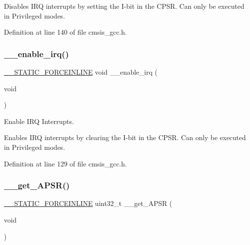 Disables I\+RQ interrupts by setting the I-\/bit in the C\+P\+SR. Can only be executed in Privileged modes. 

Definition at line 140 of file cmsis\+\_\+gcc.\+h.

\mbox{\label{group___c_m_s_i_s___core___reg_acc_functions_gae84bf4e95944e61937f4ed2453e5ef23}} 
\subsubsection{\texorpdfstring{\+\_\+\+\_\+enable\+\_\+irq()}{\_\_enable\_irq()}}
{\footnotesize\ttfamily \hyperlink{cmsis__iccarm_8h_ab904513442afdf77d4f8c74f23cbb040}{\+\_\+\+\_\+\+S\+T\+A\+T\+I\+C\+\_\+\+F\+O\+R\+C\+E\+I\+N\+L\+I\+NE} void \+\_\+\+\_\+enable\+\_\+irq (\begin{DoxyParamCaption}\item[{void}]{ }\end{DoxyParamCaption})}



Enable I\+RQ Interrupts. 

Enables I\+RQ interrupts by clearing the I-\/bit in the C\+P\+SR. Can only be executed in Privileged modes. 

Definition at line 129 of file cmsis\+\_\+gcc.\+h.

\mbox{\label{group___c_m_s_i_s___core___reg_acc_functions_gadff4f1e599946e8ae96fba17b5245f04}} 
\subsubsection{\texorpdfstring{\+\_\+\+\_\+get\+\_\+\+A\+P\+S\+R()}{\_\_get\_APSR()}}
{\footnotesize\ttfamily \hyperlink{cmsis__iccarm_8h_ab904513442afdf77d4f8c74f23cbb040}{\+\_\+\+\_\+\+S\+T\+A\+T\+I\+C\+\_\+\+F\+O\+R\+C\+E\+I\+N\+L\+I\+NE} uint32\+\_\+t \+\_\+\+\_\+get\+\_\+\+A\+P\+SR (\begin{DoxyParamCaption}\item[{void}]{ }\end{DoxyParamCaption})}




